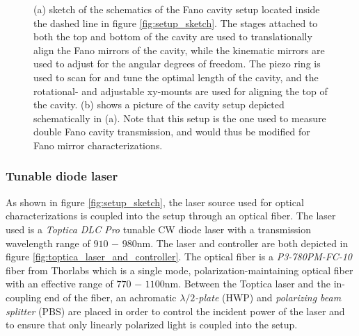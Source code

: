 \begin{figure}[h!]
\begin{subfigure}[b]{0.27\textwidth}
    \end{subfigure}
    \caption{(a) sketch of the schematics of the Fano cavity setup located inside the dashed line in figure \ref{fig:setup_sketch}. The stages attached to both the top and bottom of the cavity are used to translationally align the Fano mirrors of the cavity, while the kinematic mirrors are used to adjust for the angular degrees of freedom. The piezo ring is used to scan for and tune the optimal length of the cavity, and the rotational- and adjustable xy-mounts are used for aligning the top of the cavity. (b) shows a picture of the cavity setup depicted schematically in (a). Note that this setup is the one used to measure double Fano cavity transmission, and would thus be modified for Fano mirror characterizations.}
    \label{fig:cavity_setup}
\end{figure}

\subsubsection{Tunable diode laser}

As shown in figure \ref{fig:setup_sketch}, the laser source used for optical characterizations is coupled into the setup through an optical fiber. The laser used is a \emph{Toptica DLC Pro} tunable CW diode laser with a transmission wavelength range of $910$ $-$ $980$nm\cite{Toptica_laser}. The laser and controller are both depicted in figure \ref{fig:toptica_laser_and_controller}. The optical fiber is a \emph{P3-780PM-FC-10} fiber from Thorlabs which is a single mode, polarization-maintaining optical fiber with an effective range of $770$ $-$ $1100$nm\cite{single_mode_fiber}. Between the Toptica laser and the in-coupling end of the fiber, an achromatic $\lambda/2$\emph{-plate} (HWP) and \emph{polarizing beam splitter} (PBS) are placed in order to control the incident power of the laser and to ensure that only linearly polarized light is coupled into the setup.  

